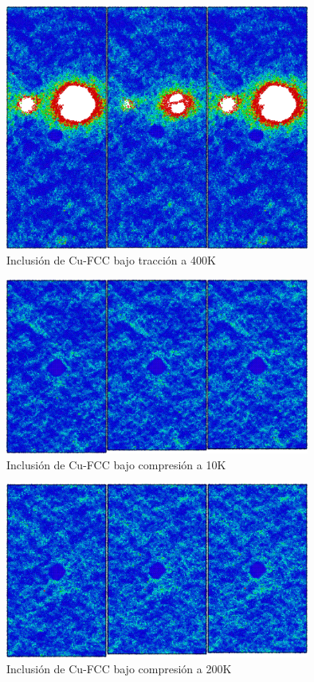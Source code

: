 \begin{figure}[htp]
\centering
\includegraphics[width=10cm]{../ResumenImagenes/Figures/NanoParticles/Snapshots/cuSphereTension_400K_Snapshots.png}
\caption{Inclusión de Cu-FCC bajo tracción a 400K}
\label{C4:fg:snapshot_ten_FCC_400K}
\end{figure}

\begin{figure}[htp]
\centering
\includegraphics[width=10cm]{../ResumenImagenes/Figures/NanoParticles/Snapshots/cuSphereCompression_10K_Snapshots.png}
\caption{Inclusión de Cu-FCC bajo compresión a 10K}
\label{C4:fg:snapshot_comp_FCC_10K}
\end{figure}

\begin{figure}[htp]
\centering
\includegraphics[width=10cm]{../ResumenImagenes/Figures/NanoParticles/Snapshots/cuSphereCompression_200K_Snapshots.png}
\caption{Inclusión de Cu-FCC bajo compresión a 200K}
\label{C4:fg:snapshot_comp_FCC_200K}
\end{figure}

